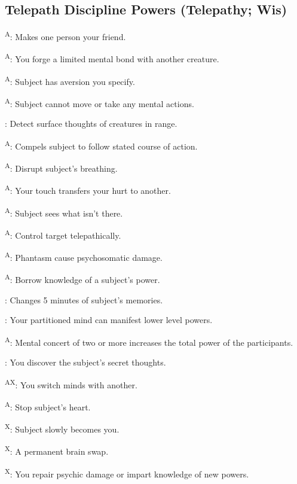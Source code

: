 \subsection{Telepath Discipline Powers {\normalsize(Telepathy; Wis)}}
\begin{enumerate*}
\item {}\textsuperscript{A}: Makes one person your friend.

\textsuperscript{A}: You forge a limited mental bond with another creature.

\item {}\textsuperscript{A}: Subject has aversion you specify.

\textsuperscript{A}: Subject cannot move or take any mental actions.

: Detect surface thoughts of creatures in range.

\textsuperscript{A}: Compels subject to follow stated course of 
action.
\item {}\textsuperscript{A}: Disrupt subject's breathing.

\textsuperscript{A}: Your touch transfers your hurt to 
another.

\textsuperscript{A}: Subject sees what isn't there.

\item {}\textsuperscript{A}: Control target telepathically.

\textsuperscript{A}: Phantasm cause psychosomatic damage. %

\textsuperscript{A}: Borrow knowledge of a subject's power.

: Changes 5 minutes of subject's memories.

: Your partitioned mind can manifest lower level powers.

\item {}\textsuperscript{A}: Mental concert of two or more increases the total power of the participants.

: You discover the subject's secret thoughts.

\item {}\textsuperscript{AX}: You switch minds with another.
\item {}\textsuperscript{A}: Stop subject's heart.
\item {}\textsuperscript{X}: Subject slowly becomes you.
\item {}\textsuperscript{X}: A permanent brain swap.

\textsuperscript{X}: You repair psychic damage or impart 
knowledge of new powers.
\end{enumerate*}